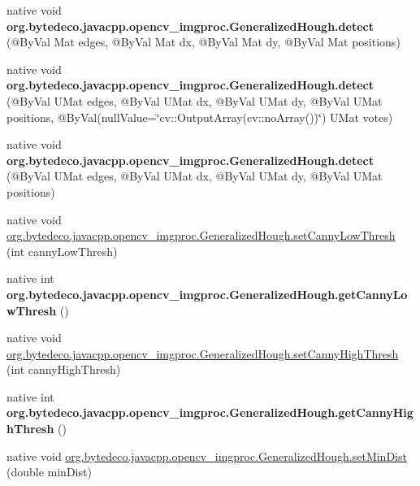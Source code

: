 \begin{DoxyCompactItemize}
\item 
\mbox{\label{group__imgproc_gadcde2aa9b6941cf3ccfc35b413a1f944}} 
native void {\bfseries org.\+bytedeco.\+javacpp.\+opencv\+\_\+imgproc.\+Generalized\+Hough.\+detect} (@By\+Val Mat edges, @By\+Val Mat dx, @By\+Val Mat dy, @By\+Val Mat positions)
\item 
\mbox{\label{group__imgproc_gac8fecc099b596cdbe4028d668608a21c}} 
native void {\bfseries org.\+bytedeco.\+javacpp.\+opencv\+\_\+imgproc.\+Generalized\+Hough.\+detect} (@By\+Val U\+Mat edges, @By\+Val U\+Mat dx, @By\+Val U\+Mat dy, @By\+Val U\+Mat positions, @By\+Val(null\+Value=\char`\"{}cv\+::\+Output\+Array(cv\+::no\+Array())\char`\"{}) U\+Mat votes)
\item 
\mbox{\label{group__imgproc_ga474783ec5e3bebdef81ccea25f920db0}} 
native void {\bfseries org.\+bytedeco.\+javacpp.\+opencv\+\_\+imgproc.\+Generalized\+Hough.\+detect} (@By\+Val U\+Mat edges, @By\+Val U\+Mat dx, @By\+Val U\+Mat dy, @By\+Val U\+Mat positions)
\item 
native void \hyperlink{group__imgproc_ga730f9badfb99e9689367d51afa76ef94}{org.\+bytedeco.\+javacpp.\+opencv\+\_\+imgproc.\+Generalized\+Hough.\+set\+Canny\+Low\+Thresh} (int canny\+Low\+Thresh)
\item 
\mbox{\label{group__imgproc_ga7306dbb0a220684c9a70d16c310c0b24}} 
native int {\bfseries org.\+bytedeco.\+javacpp.\+opencv\+\_\+imgproc.\+Generalized\+Hough.\+get\+Canny\+Low\+Thresh} ()
\item 
native void \hyperlink{group__imgproc_gaa001df9ff64a9ea3e521e5218702134f}{org.\+bytedeco.\+javacpp.\+opencv\+\_\+imgproc.\+Generalized\+Hough.\+set\+Canny\+High\+Thresh} (int canny\+High\+Thresh)
\item 
\mbox{\label{group__imgproc_gacbf4baab7a5d47be67d6cd27ac297a49}} 
native int {\bfseries org.\+bytedeco.\+javacpp.\+opencv\+\_\+imgproc.\+Generalized\+Hough.\+get\+Canny\+High\+Thresh} ()
\item 
native void \hyperlink{group__imgproc_gaccebfd3efbb606d9af90fde480a93a79}{org.\+bytedeco.\+javacpp.\+opencv\+\_\+imgproc.\+Generalized\+Hough.\+set\+Min\+Dist} (double min\+Dist)
\item 
\mbox{\label{group__imgproc_ga2c9bd9f705ac3c0622e4db84f237cc45}} 

\end{DoxyCompactItemize}

